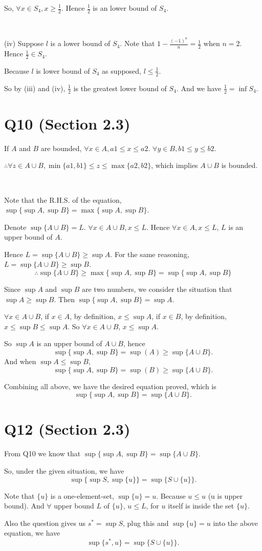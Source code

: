 \documentclass[12pt]{article}%
\begin{document}
So, $\forall x \in S_{4}, x \geq \frac{1}{2}$. Hence $\frac{1}{2}$ is an lower bound of $S_4$. 

~\

(iv) Suppose $l$ is a lower bound of $S_4$. Note that $1-\frac{(-1)^n}{n}=\frac{1}{2}$ when $n=2$. Hence $\frac{1}{2} \in S_4$. 

Because $l$ is lower bound of $S_4$ as supposed, $l \leq \frac{1}{2}$. 

So by (iii) and (iv), $\frac{1}{2}$ is the greatest lower bound of $S_4$. And we have $\frac{1}{2}=\inf{S_4}$. 


\section{Q10 (Section 2.3)}

If $A$ and $B$ are bounded, $\forall x \in A, a1 \leq x \leq a2$. $\forall y \in B, b1 \leq y \leq b2$. 

$\therefore \forall z \in A \cup B, \min\{a1,b1\} \leq z \leq \max\{a2,b2\}$, which implies $ A \cup B$ is bounded.

~\

Note that the R.H.S. of the equation, $\sup\{\sup{A},\sup{B}\}=\max\{\sup{A},\sup{B}\}$. 

Denote $\sup\{A \cup B\} = L$. $\forall x \in A \cup B, x \leq L$. Hence $\forall x \in A, x \leq L$, $L$ is an upper bound of $A$. 

Hence $L=\sup\{A \cup B\} \geq \sup{A}$. For the same reasoning, $L=\sup\{A \cup B\} \geq \sup{B}$. 
$$\therefore \sup\{A \cup B\} \geq \max\{\sup{A},\sup{B}\}=\sup\{\sup{A},\sup{B}\}$$

Since $\sup{A}$ and $\sup{B}$ are two numbers, we consider the situation that $\sup{A} \geq \sup{B}$. Then $\sup\{\sup{A},\sup{B}\}=\sup{A}$. 

$\forall x \in A \cup B$, if $x \in A$, by definition, $x \leq \sup{A}$, if $x \in B$, by definition, $x \leq \sup{B} \leq \sup{A}$. So $\forall x \in A \cup B$, $x \leq \sup{A}$. 

So $\sup{A}$ is an upper bound of $A \cup B$, hence $$\sup\{\sup{A},\sup{B}\}=\sup(A) \geq \sup\{A \cup B\}.$$ And when $\sup{A} \leq \sup{B}$, $$\sup\{\sup{A},\sup{B}\}=\sup(B) \geq \sup\{A \cup B\}.$$

Combining all above, we have the desired equation proved, which is $$\sup\{\sup{A},\sup{B}\}=\sup\{A \cup B\}.$$


\section{Q12 (Section 2.3)}

From Q10 we know that $\sup\{\sup{A},\sup{B}\}=\sup\{A \cup B\}.$

So, under the given situation, we have $$\sup\{\sup{S},\sup\{u\}\}=\sup\{S \cup \{u\}\}.$$

Note that $\{u\}$ is a one-element-set, $\sup{\{u\}}=u$. Because $u \leq u$ (u is upper bound). And $\forall$ upper bound $L$ of $\{u\}$, $u \leq L$, for $u$ itself is inside the set $\{u\}$.

Also the question gives us $s^* = \sup{S}$, plug this and $\sup{\{u\}}=u$ into the above equation, we have $$\sup\{s^*,u\}=\sup\{S \cup \{u\}\}.$$
\end{document}
